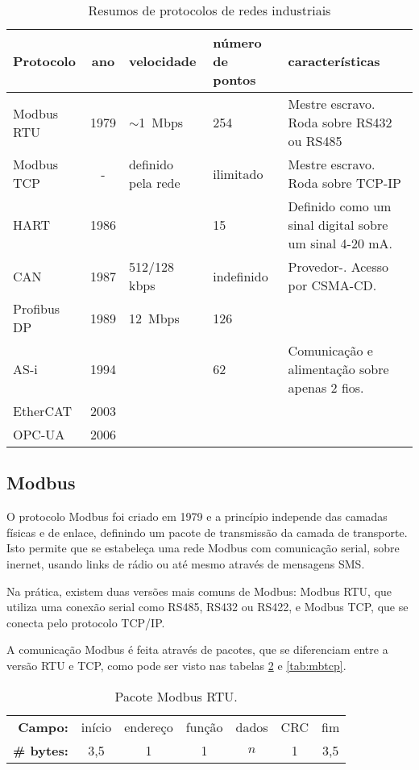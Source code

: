 \begin{table}[h]
    \caption{Resumos de protocolos de redes industriais}\label{tab:protocolos}
    \begin{tabular}{l|cp{20mm}p{20mm}p{35mm}}
        \hline
        Protocolo & ano & velocidade & número de pontos & características\\
        \hline
        Modbus RTU & 1979 & $\sim$1~Mbps & 254 & Mestre escravo. Roda sobre RS432 ou RS485\\
        Modbus TCP & - & definido pela rede & ilimitado & Mestre escravo. Roda sobre TCP-IP\\
        HART & 1986 & & 15 & Definido como um sinal digital sobre um sinal 4-20 mA.\\
        CAN & 1987 & 512/128 kbps & indefinido & Provedor-. Acesso por CSMA-CD.\\
        Profibus DP & 1989 & 12~Mbps & 126 & \\
        AS-i & 1994 & & 62 & Comunicação e alimentação sobre apenas 2 fios.\\
        EtherCAT & 2003 & & & \\
        OPC-UA & 2006 & & & \\
        \hline
    \end{tabular}
\end{table}

\subsection{Modbus}

O protocolo Modbus foi criado em 1979 e a princípio independe das camadas físicas e de enlace, definindo um pacote de transmissão da camada de transporte. Isto permite que se estabeleça uma rede Modbus com comunicação serial, sobre inernet, usando links de rádio ou até mesmo através de mensagens SMS.

Na prática, existem duas versões mais comuns de Modbus: Modbus RTU, que utiliza uma conexão serial como RS485, RS432 ou RS422, e Modbus TCP, que se conecta pelo protocolo TCP/IP.

A comunicação Modbus é feita através de pacotes, que se diferenciam entre a versão RTU e TCP, como pode ser visto nas tabelas \ref{tab:mbrtu} e \ref{tab:mbtcp}.

\begin{table}
    \centering
    \caption{Pacote Modbus RTU.}\label{tab:mbrtu}
    \begin{tabular}{r|c|c|c|c|c|c|}
        \cline{2-7}
        \textbf{Campo:} & início & endereço & função & dados & CRC & fim\\
        \cline{2-7}
        \textbf{\# bytes:} & 3,5 & 1 & 1 & $n$ & 1 & 3,5 \\
        \cline{2-7}
    \end{tabular}
\end{table}


